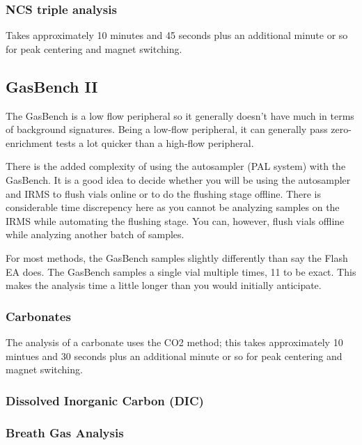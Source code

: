 \documentclass[12pt]{../SOP3_beta}\usepackage[]{graphicx}\usepackage[]{color}
\begin{document}
\subsubsection{NCS triple analysis} 

\NP Takes approximately 10 minutes and 45 seconds plus an additional minute or so for peak centering and magnet switching.

\subsection{GasBench II}

\NP The GasBench is a low flow peripheral so it generally doesn't have much in terms of background signatures. Being a low-flow peripheral, it can generally pass zero-enrichment tests a lot quicker than a high-flow peripheral.

\NP There is the added complexity of using the autosampler (PAL system) with the GasBench. It is a good idea to decide whether you will be using the autosampler and IRMS to flush vials online or to do the flushing stage offline. There is considerable time discrepency here as you cannot be analyzing samples on the IRMS while automating the flushing stage. You can, however, flush vials offline while analyzing another batch of samples.

\NP For most methods, the GasBench samples slightly differently than say the Flash EA does. The GasBench samples a single vial multiple times, 11 to be exact. This makes the analysis time a little longer than you would initially anticipate.

\subsubsection{Carbonates}

\NP The analysis of a carbonate uses the CO2 method; this takes approximately 10 mintues and 30 seconds plus an additional minute or so for peak centering and magnet switching.

\subsubsection{Dissolved Inorganic Carbon (DIC)}

\subsubsection{Breath Gas Analysis}
\end{document}
